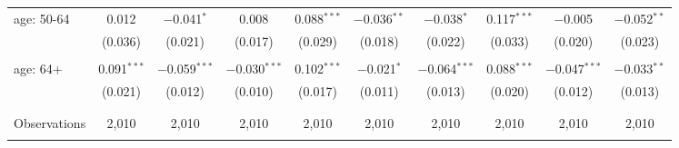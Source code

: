\begin{tabular}{@{\extracolsep{5pt}}lccccccccc}
 age: 50-64 & 0.012 & $-$0.041$^{*}$ & 0.008 & 0.088$^{***}$ & $-$0.036$^{**}$ & $-$0.038$^{*}$ & 0.117$^{***}$ & $-$0.005 & $-$0.052$^{**}$ \\ 
  & (0.036) & (0.021) & (0.017) & (0.029) & (0.018) & (0.022) & (0.033) & (0.020) & (0.023) \\ 
  & & & & & & & & & \\ 
 age: 64+ & 0.091$^{***}$ & $-$0.059$^{***}$ & $-$0.030$^{***}$ & 0.102$^{***}$ & $-$0.021$^{*}$ & $-$0.064$^{***}$ & 0.088$^{***}$ & $-$0.047$^{***}$ & $-$0.033$^{**}$ \\ 
  & (0.021) & (0.012) & (0.010) & (0.017) & (0.011) & (0.013) & (0.020) & (0.012) & (0.013) \\ 
  & & & & & & & & & \\ 
\hline \\[-1.8ex] 

Observations & 2,010 & 2,010 & 2,010 & 2,010 & 2,010 & 2,010 & 2,010 & 2,010 & 2,010 \\ 
\hline 
\hline \\[-1.8ex] 
\end{tabular} 